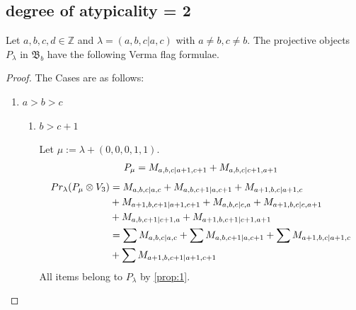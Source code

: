 
\subsection{degree of atypicality = 2}
\begin{theorem}
  Let $a,b,c,d \in \mathbb{Z}$ and $\lambda = (a,b,c|a,c)$ with $a \neq b, c\neq b$. The projective objects $P_{\lambda}$ in $\mathfrak{B}_{b}$ have the following Verma flag formulae.
\end{theorem}
\begin{proof} The Cases are as follows:\par
  \begin{enumerate}
    \item $a>b>c$
      \begin{enumerate}
        \item $b>c+1$ \par
        Let $\mu:=\lambda + (0,0,0,1,1) $.
        \begin{equation}\notag
          \begin{aligned}
            P_\mu = M_{a,b,c|a+1,c+1}
+ M_{a,b,c|c+1,a+1}
          \end{aligned}
        \end{equation}
        \begin{equation}\notag
          \begin{aligned}
            Pr_{\lambda}(P_\mu \otimes V_{3}) &=
M_{a,b,c|a,c}
+ M_{a,b,c+1|a,c+1}
+ M_{a+1,b,c|a+1,c} \\
                                              &
+ M_{a+1,b,c+1|a+1,c+1}
+ M_{a,b,c|c,a}
+ M_{a+1,b,c|c,a+1}\\
                                              &
+ M_{a,b,c+1|c+1,a}
+ M_{a+1,b,c+1|c+1,a+1} \\
                                               &=
\sum M_{a,b,c|a,c}
+ \sum M_{a,b,c+1|a,c+1}
+ \sum M_{a+1,b,c|a+1,c}\\
                                              &
+ \sum M_{a+1,b,c+1|a+1,c+1}
          \end{aligned}
        \end{equation}
All items belong to $P_\lambda$ by \cref{prop:1}.


\end{enumerate}
\end{enumerate}
\end{proof}
